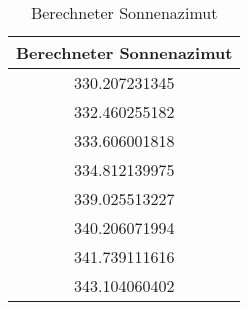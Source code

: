 \begin{table}[h!]
\centering
\begin{tabular}{c}
Berechneter Sonnenazimut \\
\hline
330.207231345\\
332.460255182\\
333.606001818\\
334.812139975\\
339.025513227\\
340.206071994\\
341.739111616\\
343.104060402\\
\end{tabular}
\caption{Berechneter Sonnenazimut}
\label{sonnenaz}
\end{table}

\newpage
\lstset{language=Python}
\lstset{inputencoding=utf8/latin1}
\lstset{numbers=left, numberstyle=\tiny, stepnumber=2, numbersep=5pt}

